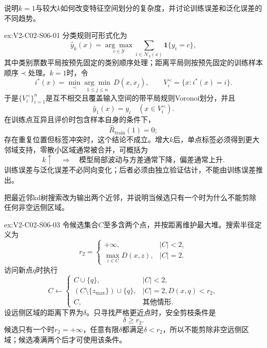 \begin{SLChapterExercisePairSection}

\SLSourceBookExercises

\begin{exercise}\label{ex:V2-C02-S06-01}
说明$k=1$与较大$k$如何改变特征空间划分的复杂度，并讨论训练误差和泛化误差的不同趋势。
\end{exercise}
\ifSLFullEdition
{}\label{sol:V2-C02-S06-01}
\begin{chapterexercisesolution}{ex:V2-C02-S06-01}
分类规则可形式化为
\[
\widehat y_k(x)
=\underset{c\in\mathcal Y}{\arg\max}
\sum_{i\in\mathcal N_k(x)}\mathbf1\{y_i=c\},
\]
其中类别票数平局按预先固定的类别顺序处理；距离平局则按预先固定的训练样本顺序$\prec$处理。$k=1$时，令
\[
i^*(x)=\min_{\prec}\underset{1\leq j\leq n}{\arg\min}\,D(x,x_j),
\qquad
V_i^{\prec}=\{x:i^*(x)=i\}.
\]
于是$\{V_i^{\prec}\}_{i=1}^n$是互不相交且覆盖输入空间的带平局规则Voronoi划分，并且
\[
\widehat y_1(x)=y_i\quad(x\in V_i^{\prec}).
\]
在训练点互异且评价时包含样本自身的条件下，
\[
\widehat R_{\mathrm{train}}(1)=0;
\]
存在重复位置但标签冲突时，这个结论不成立。增大$k$后，单点标签必须得到更大邻域支持，零散小区域通常被合并，可概括为
\[
k\uparrow\quad\Longrightarrow\quad
\text{模型局部波动与方差通常下降，偏差通常上升}.
\]
训练误差与泛化误差不必同向变化；后者必须由独立验证估计，不能由训练误差推出。
\end{chapterexercisesolution}
\fi

\begin{exercise}\label{ex:V2-C02-S06-03}
把最近邻kd树搜索改为输出两个近邻，并说明当候选只有一个时为什么不能剪除任何非空远侧区域。
\end{exercise}
\ifSLFullEdition
{}\label{sol:V2-C02-S06-03}
\begin{chapterexercisesolution}{ex:V2-C02-S06-03}
令候选集合$C$至多含两个点，并按距离维护最大堆。搜索半径定义为
\[
r_2=
\begin{cases}
+\infty,&|C|<2,\\
\max_{z\in C}D(x,z),&|C|=2.
\end{cases}
\]
访问新点$q$时执行
\[
C\leftarrow
\begin{cases}
C\cup\{q\},&|C|<2,\\
(C\setminus\{z_{\max}\})\cup\{q\},&|C|=2, D(x,q)<r_2,\\
C,&\text{其他情形}.
\end{cases}
\]
设远侧区域的距离下界为$\delta$。只寻找严格更近点时，安全剪枝条件是
\[
\delta\geq r_2.
\]
候选只有一个时$r_2=+\infty$，任意有限$\delta$都满足$\delta<r_2$，所以不能剪除非空远侧区域；候选凑满两个后才可使用该条件。
\end{chapterexercisesolution}
\fi


\end{SLChapterExercisePairSection}
